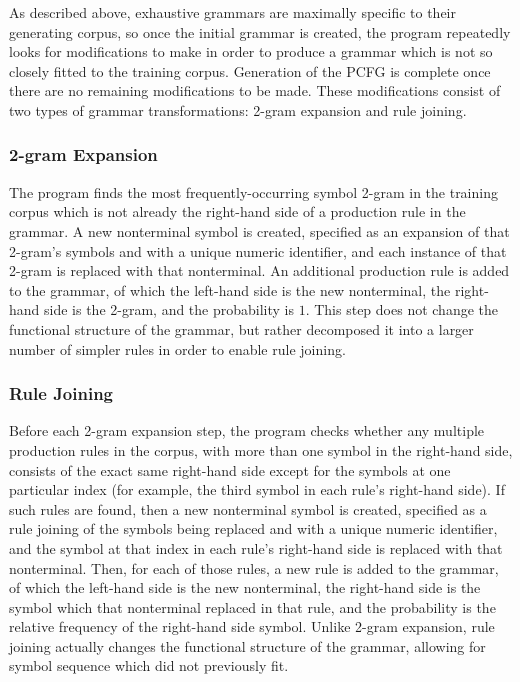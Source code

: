 \documentclass[paper=a4, fontsize=11pt]{scrartcl} %
\numberwithin{equation}{section} %
\numberwithin{figure}{section} %
\numberwithin{table}{section} %
\begin{document}
As described above, exhaustive grammars are maximally specific to their generating corpus, so once the initial grammar is created, the program repeatedly looks for modifications to make in order to produce a grammar which is not so closely fitted to the training corpus. Generation of the PCFG is complete once there are no remaining modifications to be made. These modifications consist of two types of grammar transformations: 2-gram expansion and rule joining.

\subsubsection{2-gram Expansion}

The program finds the most frequently-occurring symbol 2-gram in the training corpus which is not already the right-hand side of a production rule in the grammar. A new nonterminal symbol is created, specified as an expansion of that 2-gram's symbols and with a unique numeric identifier, and each instance of that 2-gram is replaced with that nonterminal. An additional production rule is added to the grammar, of which the left-hand side is the new nonterminal, the right-hand side is the 2-gram, and the probability is $1$. This step does not change the functional structure of the grammar, but rather decomposed it into a larger number of simpler rules in order to enable rule joining.

\subsubsection{Rule Joining}

Before each 2-gram expansion step, the program checks whether any multiple production rules in the corpus, with more than one symbol in the right-hand side, consists of the exact same right-hand side except for the symbols at one particular index (for example, the third symbol in each rule's right-hand side). If such rules are found, then a new nonterminal symbol is created, specified as a rule joining of the symbols being replaced and with a unique numeric identifier, and the symbol at that index in each rule's right-hand side is replaced with that nonterminal. Then, for each of those rules, a new rule is added to the grammar, of which the left-hand side is the new nonterminal, the right-hand side is the symbol which that nonterminal replaced in that rule, and the probability is the relative frequency of the right-hand side symbol. Unlike 2-gram expansion, rule joining actually changes the functional structure of the grammar, allowing for symbol sequence which did not previously fit.
\end{document}
